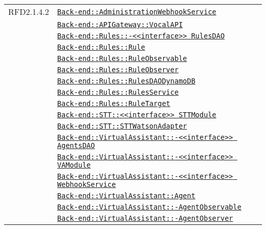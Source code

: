 \begin{longtable}{|>{\centering}m{3cm}|m{10cm}<{\centering}|}
RFD2.1.4.2 & \hyperref[Back-end::AdministrationWebhookService]{\texttt{Back-end::AdministrationWebhookService}}\\
& \hyperref[Back-end::APIGateway::VocalAPI]{\texttt{Back-end::APIGateway::VocalAPI}}\\
& \hyperref[Back-end::Rules::<<interface>> RulesDAO]{\texttt{Back-end::Rules::-\linebreak <<interface>> RulesDAO}}\\
& \hyperref[Back-end::Rules::Rule]{\texttt{Back-end::Rules::Rule}}\\
& \hyperref[Back-end::Rules::RuleObservable]{\texttt{Back-end::Rules::RuleObservable}}\\
& \hyperref[Back-end::Rules::RuleObserver]{\texttt{Back-end::Rules::RuleObserver}}\\
& \hyperref[Back-end::Rules::RulesDAODynamoDB]{\texttt{Back-end::Rules::RulesDAODynamoDB}}\\
& \hyperref[Back-end::Rules::RulesService]{\texttt{Back-end::Rules::RulesService}}\\
& \hyperref[Back-end::Rules::RuleTarget]{\texttt{Back-end::Rules::RuleTarget}}\\
& \hyperref[Back-end::STT::<<interface>> STTModule]{\texttt{Back-end::STT::<<interface>> STTModule}}\\
& \hyperref[Back-end::STT::STTWatsonAdapter]{\texttt{Back-end::STT::STTWatsonAdapter}}\\
& \hyperref[Back-end::VirtualAssistant::<<interface>> AgentsDAO]{\texttt{Back-end::VirtualAssistant::-\linebreak <<interface>> AgentsDAO}}\\
& \hyperref[Back-end::VirtualAssistant::<<interface>> VAModule]{\texttt{Back-end::VirtualAssistant::-\linebreak <<interface>> VAModule}}\\
& \hyperref[Back-end::VirtualAssistant::<<interface>> WebhookService]{\texttt{Back-end::VirtualAssistant::-\linebreak <<interface>> WebhookService}}\\
& \hyperref[Back-end::VirtualAssistant::Agent]{\texttt{Back-end::VirtualAssistant::Agent}}\\
& \hyperref[Back-end::VirtualAssistant::AgentObservable]{\texttt{Back-end::VirtualAssistant::-\linebreak AgentObservable}}\\
& \hyperref[Back-end::VirtualAssistant::AgentObserver]{\texttt{Back-end::VirtualAssistant::-\linebreak AgentObserver}}\\

\end{longtable}
